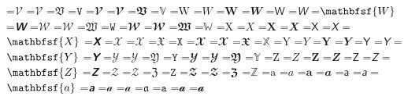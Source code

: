 \documentclass{article}
\begin{document}
=\hbox{$\mathcal{V}$}
=\hbox{$\mathscr{V}$}
=\hbox{$\mathfrak{V}$}
=\hbox{$\mathtt{V}$}
=\hbox{$\mathbfcal{V}$}
=\hbox{$\mathbfscr{V}$}
=\hbox{$\mathbffrak{V}$}
=\hbox{$\mathbb{V}$}
=\hbox{$\mathrm{W}$}
=\hbox{$\mathit{W}$}
=\hbox{$\mathbf{W}$}
=\hbox{$\mathbfit{W}$}
=\hbox{$\mathsf{W}$}
=\hbox{$\mathsfit{W}$}
=\hbox{$\mathbfsf{W}$}
=\hbox{$\mathbfsfit{W}$}
=\hbox{$\mathcal{W}$}
=\hbox{$\mathscr{W}$}
=\hbox{$\mathfrak{W}$}
=\hbox{$\mathtt{W}$}
=\hbox{$\mathbfcal{W}$}
=\hbox{$\mathbfscr{W}$}
=\hbox{$\mathbffrak{W}$}
=\hbox{$\mathbb{W}$}
=\hbox{$\mathrm{X}$}
=\hbox{$\mathit{X}$}
=\hbox{$\mathbf{X}$}
=\hbox{$\mathbfit{X}$}
=\hbox{$\mathsf{X}$}
=\hbox{$\mathsfit{X}$}
=\hbox{$\mathbfsf{X}$}
=\hbox{$\mathbfsfit{X}$}
=\hbox{$\mathcal{X}$}
=\hbox{$\mathscr{X}$}
=\hbox{$\mathfrak{X}$}
=\hbox{$\mathtt{X}$}
=\hbox{$\mathbfcal{X}$}
=\hbox{$\mathbfscr{X}$}
=\hbox{$\mathbffrak{X}$}
=\hbox{$\mathbb{X}$}
=\hbox{$\mathrm{Y}$}
=\hbox{$\mathit{Y}$}
=\hbox{$\mathbf{Y}$}
=\hbox{$\mathbfit{Y}$}
=\hbox{$\mathsf{Y}$}
=\hbox{$\mathsfit{Y}$}
=\hbox{$\mathbfsf{Y}$}
=\hbox{$\mathbfsfit{Y}$}
=\hbox{$\mathcal{Y}$}
=\hbox{$\mathscr{Y}$}
=\hbox{$\mathfrak{Y}$}
=\hbox{$\mathtt{Y}$}
=\hbox{$\mathbfcal{Y}$}
=\hbox{$\mathbfscr{Y}$}
=\hbox{$\mathbffrak{Y}$}
=\hbox{$\mathbb{Y}$}
=\hbox{$\mathrm{Z}$}
=\hbox{$\mathit{Z}$}
=\hbox{$\mathbf{Z}$}
=\hbox{$\mathbfit{Z}$}
=\hbox{$\mathsf{Z}$}
=\hbox{$\mathsfit{Z}$}
=\hbox{$\mathbfsf{Z}$}
=\hbox{$\mathbfsfit{Z}$}
=\hbox{$\mathcal{Z}$}
=\hbox{$\mathscr{Z}$}
=\hbox{$\mathfrak{Z}$}
=\hbox{$\mathtt{Z}$}
=\hbox{$\mathbfcal{Z}$}
=\hbox{$\mathbfscr{Z}$}
=\hbox{$\mathbffrak{Z}$}
=\hbox{$\mathbb{Z}$}
=\hbox{$\mathrm{a}$}
=\hbox{$\mathit{a}$}
=\hbox{$\mathbf{a}$}
=\hbox{$\mathbfit{a}$}
=\hbox{$\mathsf{a}$}
=\hbox{$\mathsfit{a}$}
=\hbox{$\mathbfsf{a}$}
=\hbox{$\mathbfsfit{a}$}
=\hbox{$\mathcal{a}$}
=\hbox{$\mathscr{a}$}
=\hbox{$\mathfrak{a}$}
=\hbox{$\mathtt{a}$}
=\hbox{$\mathbfcal{a}$}
=\hbox{$\mathbfscr{a}$}
\end{document}
